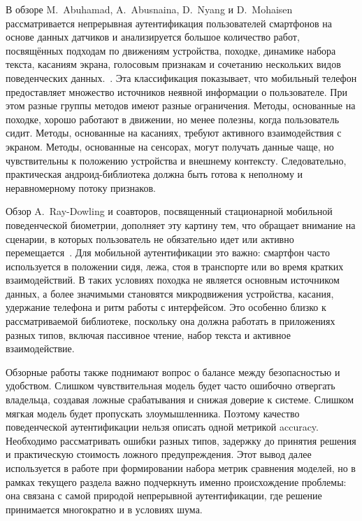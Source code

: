 \documentclass[oneside,senior,etd]{BYUPhys}
\begin{document}
В обзоре M.~Abuhamad, A.~Abusnaina, D.~Nyang и D.~Mohaisen рассматривается непрерывная аутентификация пользователей смартфонов на основе данных датчиков и анализируется большое количество работ, посвящённых подходам по движениям устройства, походке, динамике набора текста, касаниям экрана, голосовым признакам и сочетанию нескольких видов поведенческих данных.~\cite{abuhamad2021contemporary}. Эта классификация показывает, что мобильный телефон предоставляет множество источников неявной информации о пользователе. При этом разные группы методов имеют разные ограничения. Методы, основанные на походке, хорошо работают в движении, но менее полезны, когда пользователь сидит. Методы, основанные на касаниях, требуют активного взаимодействия с экраном. Методы, основанные на сенсорах, могут получать данные чаще, но чувствительны к положению устройства и внешнему контексту. Следовательно, практическая андроид-библиотека должна быть готова к неполному и неравномерному потоку признаков.

Обзор A.~Ray-Dowling и соавторов, посвященный стационарной мобильной поведенческой биометрии, дополняет эту картину тем, что обращает внимание на сценарии, в которых пользователь не обязательно идет или активно перемещается~\cite{raydowling2023stationary}. Для мобильной аутентификации это важно: смартфон часто используется в положении сидя, лежа, стоя в транспорте или во время кратких взаимодействий. В таких условиях походка не является основным источником данных, а более значимыми становятся микродвижения устройства, касания, удержание телефона и ритм работы с интерфейсом. Это особенно близко к рассматриваемой библиотеке, поскольку она должна работать в приложениях разных типов, включая пассивное чтение, набор текста и активное взаимодействие.

Обзорные работы также поднимают вопрос о балансе между безопасностью и удобством. Слишком чувствительная модель будет часто ошибочно отвергать владельца, создавая ложные срабатывания и снижая доверие к системе. Слишком мягкая модель будет пропускать злоумышленника. Поэтому качество поведенческой аутентификации нельзя описать одной метрикой accuracy. Необходимо рассматривать ошибки разных типов, задержку до принятия решения и практическую стоимость ложного предупреждения. Этот вывод далее используется в работе при формировании набора метрик сравнения моделей, но в рамках текущего раздела важно подчеркнуть именно происхождение проблемы: она связана с самой природой непрерывной аутентификации, где решение принимается многократно и в условиях шума.
\end{document}
